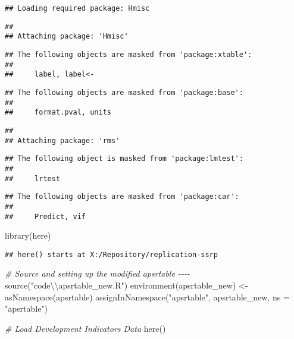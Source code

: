 \documentclass[
]{article}
\newenvironment{Shaded}{\begin{snugshade}}{\end{snugshade}}
\newcommand{\AttributeTok}[1]{\textcolor[rgb]{0.77,0.63,0.00}{#1}}
\newcommand{\CommentTok}[1]{\textcolor[rgb]{0.56,0.35,0.01}{\textit{#1}}}
\newcommand{\FunctionTok}[1]{\textcolor[rgb]{0.00,0.00,0.00}{#1}}
\newcommand{\NormalTok}[1]{#1}
\newcommand{\OtherTok}[1]{\textcolor[rgb]{0.56,0.35,0.01}{#1}}
\newcommand{\SpecialCharTok}[1]{\textcolor[rgb]{0.00,0.00,0.00}{#1}}
\newcommand{\StringTok}[1]{\textcolor[rgb]{0.31,0.60,0.02}{#1}}
\begin{document}
\begin{verbatim}
## Loading required package: Hmisc
\end{verbatim}

\begin{verbatim}
## 
## Attaching package: 'Hmisc'
\end{verbatim}

\begin{verbatim}
## The following objects are masked from 'package:xtable':
## 
##     label, label<-
\end{verbatim}

\begin{verbatim}
## The following objects are masked from 'package:base':
## 
##     format.pval, units
\end{verbatim}

\begin{verbatim}
## 
## Attaching package: 'rms'
\end{verbatim}

\begin{verbatim}
## The following object is masked from 'package:lmtest':
## 
##     lrtest
\end{verbatim}

\begin{verbatim}
## The following objects are masked from 'package:car':
## 
##     Predict, vif
\end{verbatim}

\begin{Shaded}
\begin{Highlighting}[]
\FunctionTok{library}\NormalTok{(here)}
\end{Highlighting}
\end{Shaded}

\begin{verbatim}
## here() starts at X:/Repository/replication-ssrp
\end{verbatim}

\begin{Shaded}
\begin{Highlighting}[]
\CommentTok{\# Source and setting up the modified apsrtable {-}{-}{-}{-}}
\FunctionTok{source}\NormalTok{(}\StringTok{"code}\SpecialCharTok{\textbackslash{}\textbackslash{}}\StringTok{apsrtable\_new.R"}\NormalTok{)}
\FunctionTok{environment}\NormalTok{(apsrtable\_new) }\OtherTok{\textless{}{-}} \FunctionTok{asNamespace}\NormalTok{(}\StringTok{\textquotesingle{}apsrtable\textquotesingle{}}\NormalTok{)}
\FunctionTok{assignInNamespace}\NormalTok{(}\StringTok{"apsrtable"}\NormalTok{, apsrtable\_new, }\AttributeTok{ns =} \StringTok{"apsrtable"}\NormalTok{)}

\CommentTok{\# Load Development Indicators Data}
\FunctionTok{here}\NormalTok{()}
\end{Highlighting}
\end{Shaded}
\end{document}
